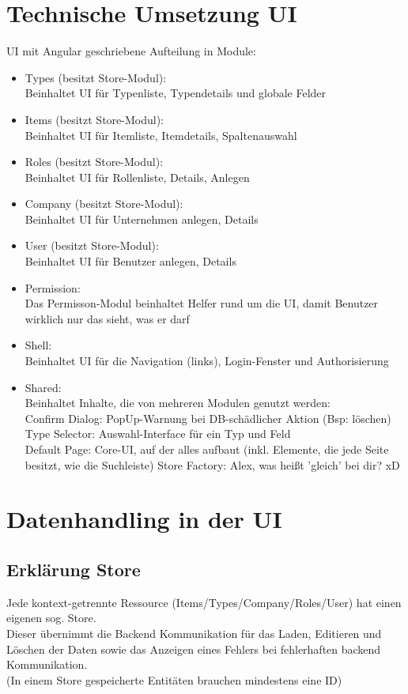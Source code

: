 \documentclass[12pt,a4paper]{report}
\begin{document}
	\section*{Technische Umsetzung UI}
		UI mit Angular geschriebene Aufteilung in Module:
		\begin{itemize}
			\item Types (besitzt Store-Modul):\\
			Beinhaltet UI für Typenliste, Typendetails und globale Felder
			\item Items (besitzt Store-Modul):\\
			Beinhaltet UI für Itemliste, Itemdetails, Spaltenauswahl
			\item Roles (besitzt Store-Modul):\\
			Beinhaltet UI für Rollenliste, Details, Anlegen
			\item Company (besitzt Store-Modul):\\
			Beinhaltet UI für Unternehmen anlegen, Details
			\item User (besitzt Store-Modul):\\
			Beinhaltet UI für Benutzer anlegen, Details
			\item Permission:\\
			Das Permisson-Modul beinhaltet Helfer rund um die UI, damit Benutzer wirklich nur das sieht, was er darf\\
			\item Shell:\\
			Beinhaltet UI für die Navigation (links), Login-Fenster und Authorisierung
			\item Shared:\\
			Beinhaltet Inhalte, die von mehreren Modulen genutzt werden:\\
			Confirm Dialog: PopUp-Warnung bei DB-schädlicher Aktion (Bsp: löschen)\\
			Type Selector: Auswahl-Interface für ein Typ und Feld\\
			Default Page: Core-UI, auf der alles aufbaut (inkl. Elemente, die jede Seite besitzt, wie die Suchleiste)
			Store Factory: Alex, was heißt 'gleich' bei dir? xD
	\end{itemize}
\clearpage
	\section*{Datenhandling in der UI}
		\subsection*{Erklärung Store}
		Jede kontext-getrennte Ressource (Items/Types/Company/Roles/User) hat einen eigenen sog. Store.\\
		Dieser übernimmt die Backend Kommunikation für das Laden, Editieren und Löschen der Daten sowie das Anzeigen eines Fehlers bei fehlerhaften backend Kommunikation. \\
		(In einem Store gespeicherte Entitäten brauchen mindestens eine ID)\\~\\
		
\end{document}
